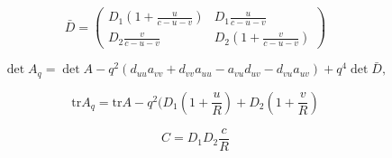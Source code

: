 \documentclass{article}
\newcommand{\tr}{\text{tr}}
\begin{document}
\begin{equation}
\bar{D} = \begin{pmatrix} D_1(1+\frac{u}{c-u-v}) & D_1\frac{u}{c-u-v}\\ D_2\frac{v}{c-u-v} & D_2(1+\frac{v}{c-u-v})\end{pmatrix} 
\end{equation}

	\begin{equation}
	\det A_{q}=\det A-q^2\left(d_{uu}a_{vv}+d_{vv}a_{uu}-a_{vu}d_{uv}-d_{vu}a_{uv}\right)+q^4 \det \bar{D},
	\end{equation}
	
	\begin{equation}
	\tr A_q = \tr A - q^2 (D_1 (1+\frac uR) + D_2 (1+\frac vR)
	\end{equation}
	
	\begin{equation}
	C = D_1D_2 \frac{c}{R}
	\end{equation}
	
\end{document}
